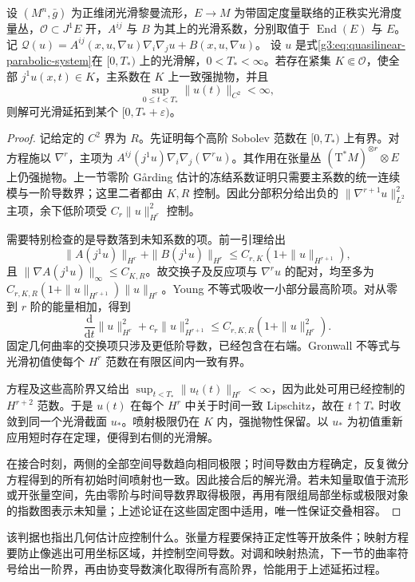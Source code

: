 \begin{theorem}\label{g3:thm:quasilinear-parabolic-continuation}
	设 \((M^n,\bar g)\) 为正维闭光滑黎曼流形，\(E\to M\) 为带固定度量联络的正秩实光滑度量丛，\(\mathcal O\subset J^1E\) 开，\(A^{ij}\) 与 \(B\) 为其上的光滑系数，分别取值于 \(\operatorname{End}(E)\) 与 \(E\)。记 \(\mathcal Q(u)=A^{ij}(x,u,\nabla u)\nabla_i\nabla_ju+B(x,u,\nabla u)\)。
	设 \(u\) 是式\eqref{g3:eq:quasilinear-parabolic-system}在 \([0,T_*)\) 上的光滑解，\(0<T_*<\infty\)。若存在紧集 \(K\Subset\mathcal O\)，使全部 \(j^1u(x,t)\in K\)，主系数在 \(K\) 上一致强抛物，并且
	\[
		\sup_{0\le t<T_*}\|u(t)\|_{C^2}<\infty,
	\]
	则解可光滑延拓到某个 \([0,T_*+\varepsilon)\)。
\end{theorem}
\begin{proof}
	记给定的 \(C^2\) 界为 \(R\)。先证明每个高阶 Sobolev 范数在 \([0,T_*)\) 上有界。对方程施以 \(\nabla^r\)，主项为 \(A^{ij}(j^1u)\nabla_i\nabla_j(\nabla^ru)\)。其作用在张量丛 \((\mathrm T^*M)^{\otimes r}\otimes E\) 上仍强抛物。上一节零阶 Gårding 估计的冻结系数证明只需要主系数的统一连续模与一阶导数界；这里二者都由 \(K,R\) 控制。因此分部积分给出负的 \(\|\nabla^{r+1}u\|_{L^2}^2\) 主项，余下低阶项受 \(C_r\|u\|_{H^r}^2\) 控制。

	需要特别检查的是导数落到未知系数的项。前一引理给出
	\[
		\|A(j^1u)\|_{H^r}+\|B(j^1u)\|_{H^r}
		\le C_{r,K}(1+\|u\|_{H^{r+1}}),
	\]
	且 \(\|\nabla A(j^1u)\|_\infty\le C_{K,R}\)。故交换子及反应项与 \(\nabla^ru\) 的配对，均至多为
	\(C_{r,K,R}(1+\|u\|_{H^{r+1}})\|u\|_{H^r}\)。Young 不等式吸收一小部分最高阶项。对从零到 \(r\) 阶的能量相加，得到
	\begin{equation}\label{g3:eq:quasilinear-high-energy}
		\frac{\mathrm d}{\mathrm dt}\|u\|_{H^r}^2
		+c_r\|u\|_{H^{r+1}}^2
		\le C_{r,K,R}(1+\|u\|_{H^r}^2).
	\end{equation}
	固定几何曲率的交换项只涉及更低阶导数，已经包含在右端。Gronwall 不等式与光滑初值使每个 \(H^r\) 范数在有限区间内一致有界。

	方程及这些高阶界又给出 \(\sup_{t<T_*}\|u_t(t)\|_{H^r}<\infty\)，因为此处可用已经控制的 \(H^{r+2}\) 范数。于是 \(u(t)\) 在每个 \(H^r\) 中关于时间一致 Lipschitz，故在 \(t\uparrow T_*\) 时收敛到同一个光滑截面 \(u_*\)。喷射极限仍在 \(K\) 内，强抛物性保留。以 \(u_*\) 为初值重新应用短时存在定理，便得到右侧的光滑解。

	在接合时刻，两侧的全部空间导数趋向相同极限；时间导数由方程确定，反复微分方程得到的所有初始时间喷射也一致。因此接合后的解光滑。若未知量取值于流形或开张量空间，先由零阶与时间导数界取得极限，再用有限组局部坐标或极限对象的指数图表示未知量；上述论证在这些固定图中适用，唯一性保证交叠相容。
\end{proof}

该判据也指出几何估计应控制什么。张量方程要保持正定性等开放条件；映射方程要防止像逃出可用坐标区域，并控制空间导数。对调和映射热流，下一节的曲率符号给出一阶界，再由协变导数演化取得所有高阶界，恰能用于上述延拓过程。
